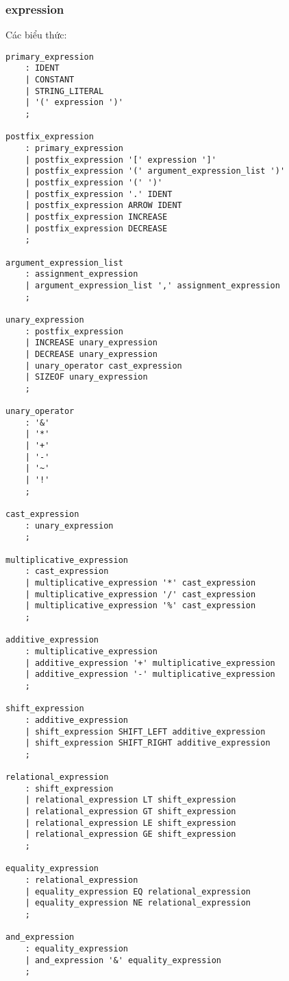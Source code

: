 \documentclass[../report.tex]{subfiles}
\begin{document}
\subsubsection{expression}
Các biểu thức: 
\begin{lstlisting}
primary_expression
    : IDENT
    | CONSTANT
    | STRING_LITERAL
    | '(' expression ')'
    ;

postfix_expression
    : primary_expression
    | postfix_expression '[' expression ']'
    | postfix_expression '(' argument_expression_list ')'
    | postfix_expression '(' ')'
    | postfix_expression '.' IDENT
    | postfix_expression ARROW IDENT
    | postfix_expression INCREASE
    | postfix_expression DECREASE
    ;

argument_expression_list
    : assignment_expression
    | argument_expression_list ',' assignment_expression
    ;

unary_expression
    : postfix_expression
    | INCREASE unary_expression
    | DECREASE unary_expression
    | unary_operator cast_expression
    | SIZEOF unary_expression
    ;

unary_operator
    : '&'
    | '*'
    | '+'
    | '-'
    | '~'
    | '!'
    ;

cast_expression
    : unary_expression
    ;

multiplicative_expression
    : cast_expression
    | multiplicative_expression '*' cast_expression
    | multiplicative_expression '/' cast_expression
    | multiplicative_expression '%' cast_expression
    ;

additive_expression
    : multiplicative_expression
    | additive_expression '+' multiplicative_expression
    | additive_expression '-' multiplicative_expression
    ;

shift_expression
    : additive_expression
    | shift_expression SHIFT_LEFT additive_expression
    | shift_expression SHIFT_RIGHT additive_expression
    ;

relational_expression
    : shift_expression
    | relational_expression LT shift_expression
    | relational_expression GT shift_expression
    | relational_expression LE shift_expression
    | relational_expression GE shift_expression
    ;

equality_expression
    : relational_expression
    | equality_expression EQ relational_expression
    | equality_expression NE relational_expression
    ;

and_expression
    : equality_expression
    | and_expression '&' equality_expression
    ;


\end{lstlisting}
\end{document}
